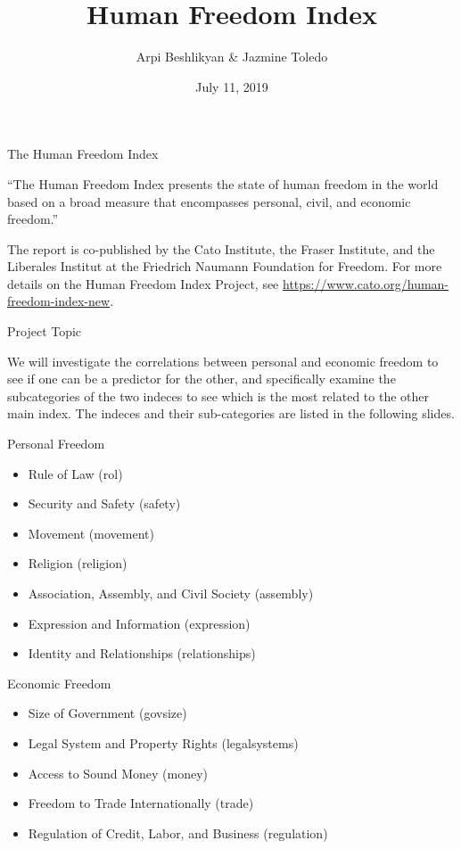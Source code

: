 \documentclass[ignorenonframetext,]{beamer}
\title{Human Freedom Index}
\author{Arpi Beshlikyan \& Jazmine Toledo}
\date{July 11, 2019}
\providecommand{\tightlist}{%
  \setlength{\itemsep}{0pt}\setlength{\parskip}{0pt}}
\begin{document}
\frame{\titlepage}

\begin{frame}{The Human Freedom Index}
\protect\hypertarget{the-human-freedom-index}{}

``The Human Freedom Index presents the state of human freedom in the
world based on a broad measure that encompasses personal, civil, and
economic freedom.''

The report is co-published by the Cato Institute, the Fraser Institute,
and the Liberales Institut at the Friedrich Naumann Foundation for
Freedom. For more details on the Human Freedom Index Project, see
\url{https://www.cato.org/human-freedom-index-new}.

\end{frame}

\begin{frame}{Project Topic}
\protect\hypertarget{project-topic}{}

We will investigate the correlations between personal and economic
freedom to see if one can be a predictor for the other, and specifically
examine the subcategories of the two indeces to see which is the most
related to the other main index. The indeces and their sub-categories
are listed in the following slides.

\end{frame}

\begin{frame}{Personal Freedom}
\protect\hypertarget{personal-freedom}{}

\begin{itemize}
\tightlist
\item
  Rule of Law (rol)
\item
  Security and Safety (safety)
\item
  Movement (movement)
\item
  Religion (religion)
\item
  Association, Assembly, and Civil Society (assembly)
\item
  Expression and Information (expression)
\item
  Identity and Relationships (relationships)
\end{itemize}

\end{frame}

\begin{frame}{Economic Freedom}
\protect\hypertarget{economic-freedom}{}

\begin{itemize}
\tightlist
\item
  Size of Government (govsize)
\item
  Legal System and Property Rights (legalsystems)
\item
  Access to Sound Money (money)
\item
  Freedom to Trade Internationally (trade)
\item
  Regulation of Credit, Labor, and Business (regulation)
\end{itemize}

\end{frame}
\end{document}
